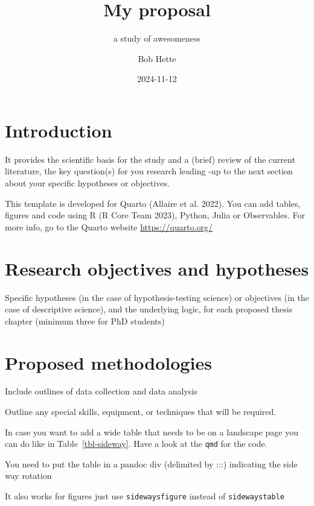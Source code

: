 \documentclass[
  letterpaper,
  DIV=11,
  numbers=noendperiod]{scrartcl}
\title{My proposal}
\subtitle{a study of awesomeness}
\author{Bob Hette}
\date{2024-11-12}
\renewcommand*\contentsname{Table of contents}
\newcommand\contentsname{Table of contents}
\begin{document}
\maketitle

\renewcommand*\contentsname{Table of contents}
{
\hypersetup{linkcolor=}
\setcounter{tocdepth}{3}
\tableofcontents
}

\section{Introduction}\label{introduction}

It provides the scientific basis for the study and a (brief) review of
the current literature, the key question(s) for you research leading -up
to the next section about your specific hypotheses or objectives.

This template is developed for Quarto (Allaire et al. 2022). You can add
tables, figures and code using R (R Core Team 2023), Python, Julia or
Observables. For more info, go to the Quarto website
\url{https://quarto.org/}

\section{Research objectives and
hypotheses}\label{research-objectives-and-hypotheses}

Specific hypotheses (in the case of hypothesis-testing science) or
objectives (in the case of descriptive science), and the underlying
logic, for each proposed thesis chapter (minimum three for PhD students)

\section{Proposed methodologies}\label{proposed-methodologies}

Include outlines of data collection and data analysis

Outline any special skills, equipment, or techniques that will be
required.

In case you want to add a wide table that needs to be on a landscape
page you can do like in Table~\ref{tbl-sideway}. Have a look at the
\texttt{qmd} for the code.

You need to put the table in a pandoc div (delimited by :::) indicating
the side way rotation

It also works for figures just use \texttt{sidewaysfigure} instead of
\texttt{sidewaystable}
\end{document}
